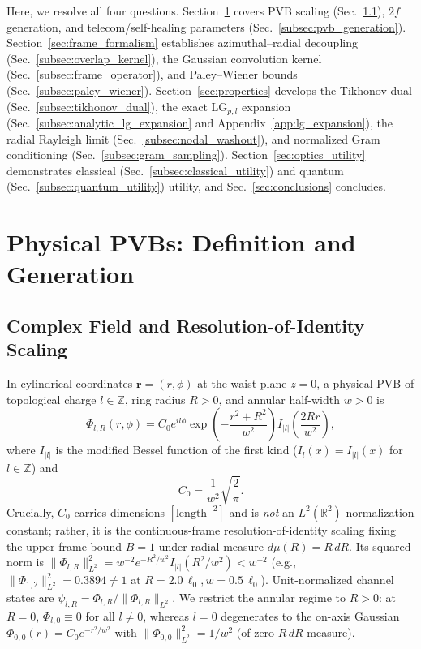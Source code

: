 \documentclass[aps,pra,reprint,amsmath,amssymb,floatfix,longbibliography]{revtex4-2}
\providecommand{\abs}[1]{\lvert#1\rvert}
\providecommand{\norm}[1]{\lVert#1\rVert}
\begin{document}
Here, we resolve all four questions. Section~\ref{sec:pvb_formation} covers PVB scaling (Sec.~\ref{subsec:pvb_def}), $2f$ generation, and telecom/self-healing parameters (Sec.~\ref{subsec:pvb_generation}). Section~\ref{sec:frame_formalism} establishes azimuthal--radial decoupling (Sec.~\ref{subsec:overlap_kernel}), the Gaussian convolution kernel (Sec.~\ref{subsec:frame_operator}), and Paley--Wiener bounds (Sec.~\ref{subsec:paley_wiener}). Section~\ref{sec:properties} develops the Tikhonov dual (Sec.~\ref{subsec:tikhonov_dual}), the exact $\mathrm{LG}_{p,l}$ expansion (Sec.~\ref{subsec:analytic_lg_expansion} and Appendix~\ref{app:lg_expansion}), the radial Rayleigh limit (Sec.~\ref{subsec:nodal_washout}), and normalized Gram conditioning (Sec.~\ref{subsec:gram_sampling}). Section~\ref{sec:optics_utility} demonstrates classical (Sec.~\ref{subsec:classical_utility}) and quantum (Sec.~\ref{subsec:quantum_utility}) utility, and Sec.~\ref{sec:conclusions} concludes.

\section{Physical PVBs: Definition and Generation}
\label{sec:pvb_formation}

\subsection{Complex Field and Resolution-of-Identity Scaling}
\label{subsec:pvb_def}

In cylindrical coordinates $\mathbf{r} = (r,\phi)$ at the waist plane $z=0$, a physical PVB of topological charge $l \in \mathbb{Z}$, ring radius $R > 0$, and annular half-width $w > 0$ is~\cite{Ostrovsky2013,Vaity2015}
\begin{equation}
\Phi_{l,R}(r,\phi) = C_0 e^{il\phi} \exp\!\left(-\frac{r^2 + R^2}{w^2}\right) I_{\abs{l}}\!\left(\frac{2Rr}{w^2}\right),
\label{eq:pvb_mode}
\end{equation}
where $I_{\abs{l}}$ is the modified Bessel function of the first kind ($I_l(x) = I_{\abs{l}}(x)$ for $l \in \mathbb{Z}$) and
\begin{equation}
C_0 = \frac{1}{w^2}\sqrt{\frac{2}{\pi}}.
\label{eq:C0_norm}
\end{equation}
Crucially, $C_0$ carries dimensions $[\mathrm{length}^{-2}]$ and is \emph{not} an $L^2(\mathbb{R}^2)$ normalization constant; rather, it is the continuous-frame resolution-of-identity scaling fixing the upper frame bound $B = 1$ under radial measure $d\mu(R) = R\,dR$. Its squared norm is $\norm{\Phi_{l,R}}_{L^2}^2 = w^{-2} e^{-R^2/w^2} I_{\abs{l}}(R^2/w^2) < w^{-2}$ (e.g., $\norm{\Phi_{1,2}}_{L^2}^2 = 0.3894 \neq 1$ at $R=2.0\,\ell_0, w=0.5\,\ell_0$). Unit-normalized channel states are $\psi_{l,R} = \Phi_{l,R}/\norm{\Phi_{l,R}}_{L^2}$. We restrict the annular regime to $R > 0$: at $R=0$, $\Phi_{l,0} \equiv 0$ for all $l \neq 0$, whereas $l=0$ degenerates to the on-axis Gaussian $\Phi_{0,0}(r) = C_0 e^{-r^2/w^2}$ with $\norm{\Phi_{0,0}}_{L^2}^2 = 1/w^2$ (of zero $R\,dR$ measure).
\end{document}
